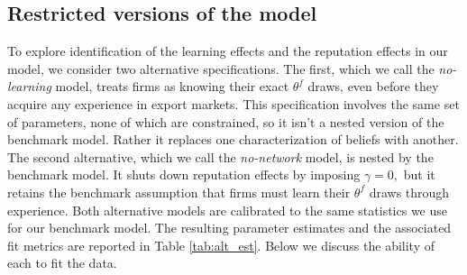 \documentclass[12pt,titlepage]{article}
\begin{document}
\bigskip

\subsection{Restricted versions of the model}

To explore identification of the learning effects and the reputation effects
in our model, we consider two alternative specifications. The first, which
we call the \textit{no-learning} model, treats firms as knowing their exact $%
\theta ^{f}$ draws, even before they acquire any experience in export
markets. This specification involves the same set of parameters, none of
which are constrained, so it isn't a nested version of the benchmark model.
Rather it replaces one characterization of beliefs with another. The second
alternative, which we call the \textit{no-network} model, is nested by the
benchmark model. It shuts down reputation effects by imposing $\gamma =0,$
but it retains the benchmark assumption that firms must learn their $\theta
^{f}$ draws through experience. Both alternative models are calibrated to the same statistics we use for our
benchmark model. The resulting parameter estimates and the associated fit
metrics are reported in Table \ref{tab:alt_est}. Below we discuss the ability of each to
fit the data.\bigskip
\end{document}
